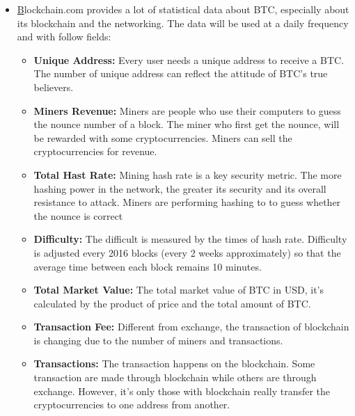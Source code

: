\documentclass[a4paper]{article}
\begin{document}
\begin{itemize}
    \item \href{https://www.blockchain.com/charts/difficulty}Blockchain.com provides a lot of statistical data about BTC, especially about its blockchain and the networking. The data will be used at a daily frequency and with follow fields:
    \begin{itemize}
        \item \textbf{Unique Address: } Every user needs a unique address to receive a BTC. The number of unique address can reflect the attitude of BTC's true believers.
        \item \textbf{Miners Revenue: } Miners are people who use their computers to guess the nounce number of a block. The miner who first get the nounce, will be rewarded with some cryptocurrencies. Miners can sell the cryptocurrencies for revenue.
        \item \textbf{Total Hast Rate:} Mining hash rate is a key security metric. The more hashing power in the network, the greater its security and its overall resistance to attack. Miners are performing hashing to to guess whether the nounce is correct
        \item \textbf{Difficulty: }The difficult is measured by the times of hash rate. Difficulty is adjusted every 2016 blocks (every 2 weeks approximately) so that the average time between each block remains 10 minutes.
        \item \textbf{Total Market Value: } The total market value of BTC in USD, it's calculated by the product of price and the total amount of BTC.
        \item \textbf{Transaction Fee: } Different from exchange, the transaction of blockchain is changing due to the number of miners and transactions.
        \item \textbf{Transactions: } The transaction happens on the blockchain. Some transaction are made through blockchain while others are through exchange. However, it's only those with blockchain really transfer the cryptocurrencies to one address from another.
    \end{itemize}
\end{itemize}
\end{document}
